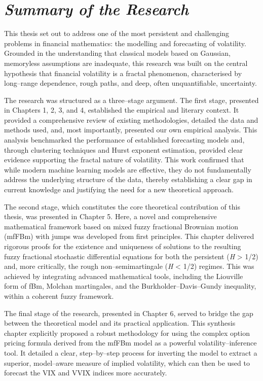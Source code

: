 \documentclass[12pt,a4paper]{report}
\numberwithin{equation}{section}
\begin{document}
\hypertarget{summary--of--the--research}{%
\section{\texorpdfstring{\emph{\textbf{Summary of the
Research}}}{Summary of the Research}}\label{summary--of--the--research}}

This thesis set out to address one of the most persistent and
challenging problems in financial mathematics: the modelling and
forecasting of volatility. Grounded in the understanding that classical
models based on Gaussian, memoryless assumptions are inadequate, this
research was built on the central hypothesis that financial volatility
is a fractal phenomenon, characterised by long--range dependence, rough
paths, and deep, often unquantifiable, uncertainty.

The research was structured as a three--stage argument. The first stage,
presented in Chapters 1, 2, 3, and 4, established the empirical and
literary context. It provided a comprehensive review of existing
methodologies, detailed the data and methods used, and, most
importantly, presented our own empirical analysis. This analysis
benchmarked the performance of established forecasting models and,
through clustering techniques and Hurst exponent estimation, provided
clear evidence supporting the fractal nature of volatility. This work
confirmed that while modern machine learning models are effective, they
do not fundamentally address the underlying structure of the data,
thereby establishing a clear gap in current knowledge and justifying the
need for a new theoretical approach.

The second stage, which constitutes the core theoretical contribution of
this thesis, was presented in Chapter 5. Here, a novel and comprehensive
mathematical framework based on mixed fuzzy fractional Brownian motion
(mfFBm) with jumps was developed from first principles. This chapter
delivered rigorous proofs for the existence and uniqueness of solutions
to the resulting fuzzy fractional stochastic differential equations for
both the persistent (\emph{H} \textgreater{} 1/2) and, more critically,
the rough non--semimartingale (\emph{H} \textless{} 1/2) regimes. This
was achieved by integrating advanced mathematical tools, including the
Liouville form of fBm, Molchan martingales, and the
Burkholder--Davis--Gundy inequality, within a coherent fuzzy framework.

The final stage of the research, presented in Chapter 6, served to
bridge the gap between the theoretical model and its practical
application. This synthesis chapter explicitly proposed a robust
methodology for using the complex option pricing formula derived from
the mfFBm model as a powerful volatility--inference tool. It detailed a
clear, step--by--step process for inverting the model to extract a
superior, model--aware measure of implied volatility, which can then be
used to forecast the VIX and VVIX indices more accurately.
\end{document}

